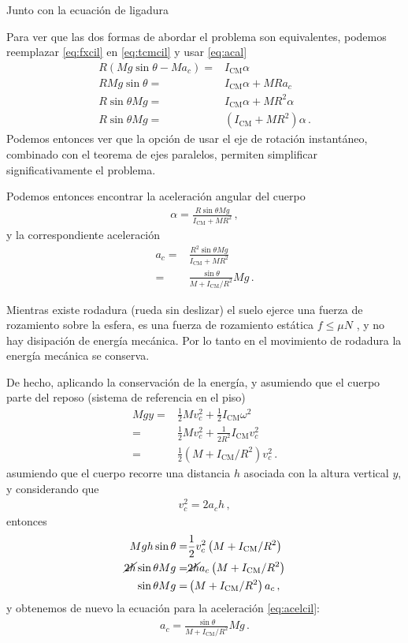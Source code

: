 Junto con la ecuación de ligadura

Para ver que las dos formas de abordar el problema son equivalentes, podemos reemplazar \eqref{eq:fxcil} en \eqref{eq:tcmcil} y usar \eqref{eq:acal} 
\begin{align*}
  R(Mg\sin\theta-M a_c)=&I_{\text{CM}}\alpha\nonumber\\
  RMg\sin\theta=&I_{\text{CM}}\alpha+M R a_c\nonumber\\
  R\sin\theta Mg=&I_{\text{CM}}\alpha+M R^2\alpha\nonumber\\
  R\sin\theta Mg=&(I_{\text{CM}}+M R^2)\alpha\,.
\end{align*}
Podemos entonces ver que la opción de usar el eje de rotación instantáneo, combinado con el teorema de ejes paralelos, permiten simplificar significativamente el problema.

Podemos entonces encontrar la aceleración angular del cuerpo
\begin{align}
  \alpha=\frac{R\sin\theta M g}{I_{\text{CM}}+MR^2}\,,
\end{align}
y la correspondiente aceleración
\begin{align}
  \label{eq:acelcil}
  a_c=&\frac{R^2\sin\theta M g}{I_{\text{CM}}+MR^2}\nonumber\\
  =&\frac{\sin\theta }{M+I_{\text{CM}}/R^2}M g\,.
\end{align}


Mientras existe rodadura (rueda sin deslizar) el suelo ejerce una
fuerza de rozamiento sobre la esfera, es una fuerza de rozamiento
estática $f \le\mu N$ , y no hay disipación de energía mecánica. 
Por lo tanto en el movimiento de rodadura la energía mecánica se
conserva.

De hecho, aplicando la conservación de la energía, y asumiendo que el cuerpo parte del reposo (sistema de referencia en el piso)
\begin{align*}
  Mgy=&\frac{1}{2}Mv_c^2+\frac{1}{2}I_{\text{CM}}\omega^2\nonumber\\
  =&\frac{1}{2}Mv_c^2+\frac{1}{2R^2}I_{\text{CM}}v_c^2\nonumber\\
  =&\frac{1}{2}\left(M+I_{\text{CM}}/R^2\right)v_c^2\,.
\end{align*}
asumiendo que el cuerpo recorre una distancia $h$ asociada con la altura vertical $y$, y considerando que
\begin{align*}
  v_c^2=2a_c h\,,
\end{align*}
entonces
\begin{align*}
  Mgh\sin\theta=&\frac{1}{2}v_c^2\left(M+I_{\text{CM}}/R^2\right)\nonumber\\
  \cancel{2h}\sin\theta Mg=&\cancel{2h}a_c\left(M+I_{\text{CM}}/R^2\right)\nonumber\\
  \sin\theta Mg=&\left(M+I_{\text{CM}}/R^2\right)a_c\,,
\end{align*}
y obtenemos de nuevo la ecuación para la aceleración \eqref{eq:acelcil}:
\begin{align*}
  a_c=\frac{\sin\theta}{M+I_{\text{CM}}/R^2}Mg\,.
\end{align*}

